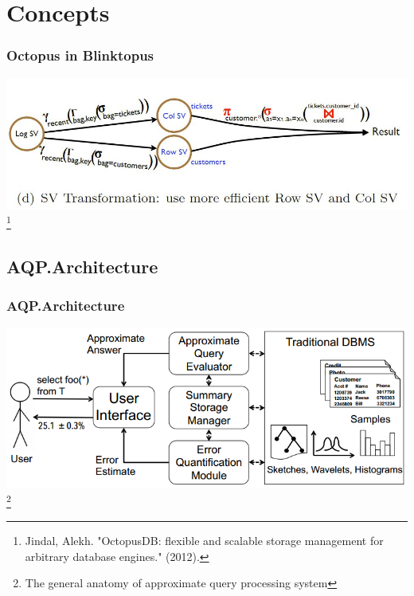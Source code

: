 \documentclass{beamer}
\begin{document}
\section{Concepts}

\begin{frame}
\frametitle{Octopus in Blinktopus}
\includegraphics[scale=0.4]{img/SV_transformation.JPG}
\footnote{Jindal, Alekh. "OctopusDB: flexible and scalable storage management for arbitrary database engines." (2012).}
\end{frame}

\subsection{AQP.Architecture}
\begin{frame}
\frametitle{AQP.Architecture}
\includegraphics[scale=0.5]{img/blinkdb-workflow.png}
\footnote{The general anatomy of approximate query processing system}
\end{frame}
\end{document}
